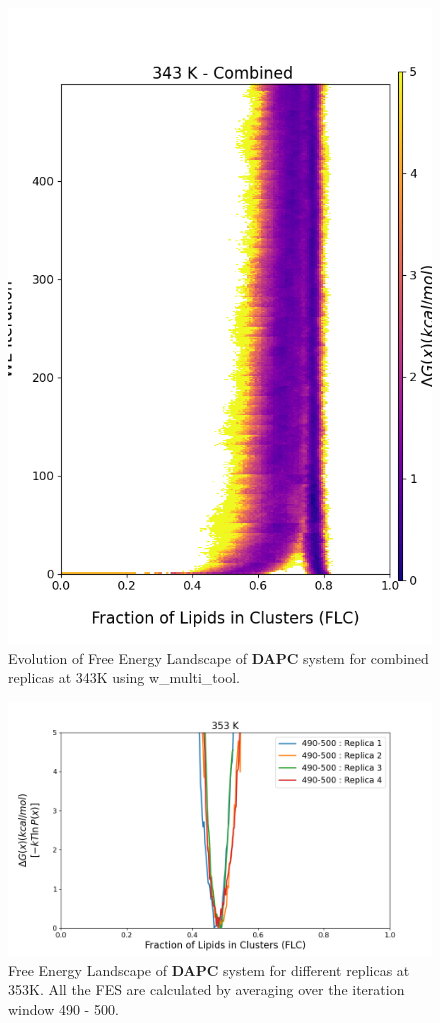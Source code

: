 \documentclass{biophys-new}
\begin{document}
\begin{figure}[hbt!]
\centering
\includegraphics[width=0.8\linewidth]{all_plots/ClusterLipids2Total/DPPC_DAPC_CHOL/343K/Evolution_DAPC_MULTI__343_ClusterLipids2Total.png}
\caption{Evolution of Free Energy Landscape of \textbf{DAPC} system for combined replicas at 343K using w\_multi\_tool.}
\label{fig:view}

\end{figure}


\begin{figure}[hbt!]
\centering
\includegraphics[width=1.1\linewidth]{all_plots/ClusterLipids2Total/DPPC_DAPC_CHOL/353K/Average_DAPC_353_ClusterLipids2Total.png}
\caption{Free Energy Landscape of \textbf{DAPC} system for different replicas at 353K. All the FES are calculated by averaging over the iteration window 490 - 500.}
\label{fig:view}

\end{figure}
\end{document}
